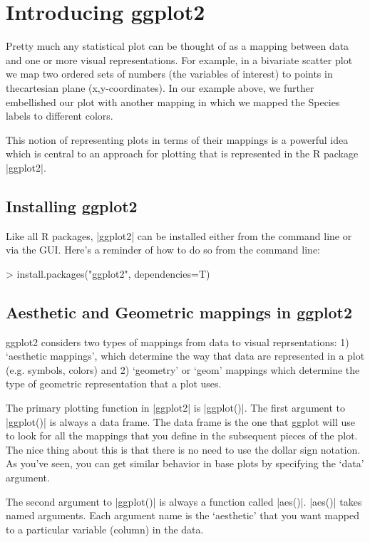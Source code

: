 \section{Introducing ggplot2}

Pretty much any statistical plot can be thought of as a mapping between data and one or more visual representations. For example, in a bivariate scatter plot we map two ordered sets of numbers (the variables of interest) to points in thecartesian plane (x,y-coordinates).  In our example above, we further embellished our plot with another mapping in which we mapped the Species labels to different colors.

This notion of representing plots in terms of their mappings is a powerful idea which is central to an approach for plotting that is represented in the R package |ggplot2|.

\subsection{Installing ggplot2}

Like all R packages, |ggplot2| can be installed either from the command line or via the GUI. Here's a reminder of how to do so from the command line:
%
\begin{R}
> install.packages("ggplot2", dependencies=T)
\end{R}

\subsection{Aesthetic and Geometric mappings in ggplot2}

ggplot2 considers two types of mappings from data to visual reprsentations: 1) `aesthetic mappings', which determine the way that data are represented in a plot (e.g. symbols, colors) and 2) `geometry' or `geom' mappings which determine the type of geometric representation that a plot uses.  

The primary plotting function in |ggplot2| is |ggplot()|. The first argument to |ggplot()| is
always a data frame. The data frame is the one that ggplot will use to look for all the mappings that you define in the subsequent pieces of the plot. The nice thing about this is that there is no need to use
the dollar sign notation. As you've seen, you can get similar behavior in base plots by specifying the `data' argument.

The second argument to |ggplot()| is always a function called |aes()|. |aes()| takes named
arguments. Each argument name is the `aesthetic' that you want mapped to a particular variable (column) in the data. 

